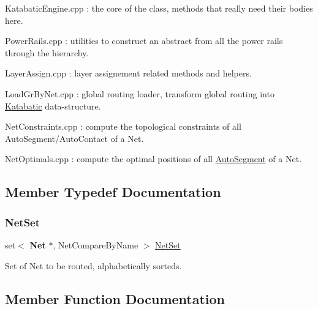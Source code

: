 \begin{DoxyItemize}
\item {\ttfamily Katabatic\+Engine.\+cpp} \+: the core of the class, methods that really need their bodies here.
\item {\ttfamily Power\+Rails.\+cpp} \+: utilities to construct an abstract from all the power rails through the hierarchy.
\item {\ttfamily Layer\+Assign.\+cpp} \+: layer assignement related methods and helpers.
\item {\ttfamily Load\+Gr\+By\+Net.\+cpp} \+: global routing loader, transform global routing into \hyperlink{namespaceKatabatic}{Katabatic} data-\/structure.
\item {\ttfamily Net\+Constraints.\+cpp} \+: compute the topological constraints of all Auto\+Segment/\+Auto\+Contact of a Net.
\item {\ttfamily Net\+Optimals.\+cpp} \+: compute the optimal positions of all \hyperlink{classKatabatic_1_1AutoSegment}{Auto\+Segment} of a Net. 
\end{DoxyItemize}

\subsection{Member Typedef Documentation}
\mbox{\label{classKatabatic_1_1KatabaticEngine_a92ed88f9aecd2f195089c4029fa8bcc7}} 
\subsubsection{\texorpdfstring{Net\+Set}{NetSet}}
{\footnotesize\ttfamily set$<$ \textbf{ Net} $\ast$, Net\+Compare\+By\+Name $>$ \hyperlink{classKatabatic_1_1KatabaticEngine_a92ed88f9aecd2f195089c4029fa8bcc7}{Net\+Set}}

Set of Net to be routed, alphabetically sorteds. 

\subsection{Member Function Documentation}
\mbox{\label{classKatabatic_1_1KatabaticEngine_ab877a64c314024602cfb04631ebfbfc4}} 
